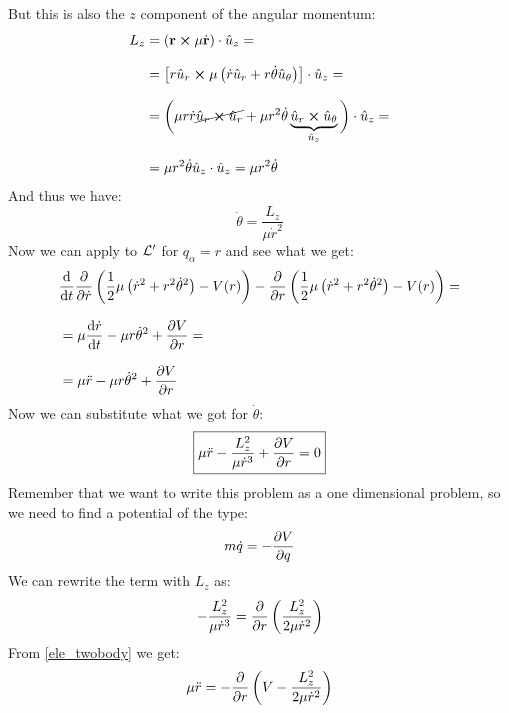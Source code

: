But this is also the $z$ component of the angular momentum:
\begin{equation}
  \begin{split}
    L_z &= \left(\vb{r}\cross \mu\dot{\vb{r}}\right) \cdot \hat{u}_z = \\[8pt]
    &= \left[r\hat{u}_r \cross \mu\left(\dot{r}\hat{u}_r + r\dot{\theta}\hat{u}_{\theta}\right)\right] \cdot \hat{u}_z = \\[8pt]
    &= \bigg(\mu r\dot{r} \cancel{\hat{u}_r \cross \hat{u}_r} + \mu r^2\dot{\theta}\underbrace{\hat{u}_r \cross \hat{u}_{\theta}}_{\hat{u}_z}\bigg) \cdot \hat{u}_z = \\[8pt]
    &= \mu r^2\dot{\theta} \hat{u}_z \cdot \hat{u}_z = \mu r^2\dot{\theta}
  \end{split}
\end{equation}
And thus we have:
\begin{equation}
  \dot{\theta} = \dfrac{L_z}{\mu \dot{r}^2}
\end{equation}
Now we can apply \eleref\;to $\mathcal{L}'$ for $q_{\alpha} = r$ and see what we get:
\begin{equation}
  \begin{split}
    &\dv{}{t}\pdv{}{\dot{r}}\brackets{\dfrac{1}{2}\mu\brackets{\dot{r}^2 + r^2\dot{\theta}^2} - V(r)} - \pdv{}{r}\brackets{\dfrac{1}{2}\mu\brackets{\dot{r}^2 + r^2\dot{\theta}^2} - V(r)} = \\[8pt]
    &= \mu\dv{\dot{r}}{t} - \mu r\dot{\theta}^2 + \pdv{V}{r}  = \\[8pt]
    &= \mu \ddot{r} - \mu r\dot{\theta}^2 + \pdv{V}{r}
  \end{split}
\end{equation}
Now we can substitute what we got for $\dot{\theta}$:
\begin{equation} \label{ele_twobody}
  \boxed{\mu \ddot{r} - \dfrac{L_z^2}{\mu \dot{r}^3} + \pdv{V}{r} = 0}
\end{equation}
Remember that we want to write this problem as a one dimensional problem, so we need to find a potential of the type:
\begin{equation}
  m\dot{q} = -\pdv{V}{q}
\end{equation}
We can rewrite the term with $L_z$ as:
\begin{equation}
  - \dfrac{L_z^2}{\mu \dot{r}^3} = \pdv{}{r}\brackets{\dfrac{L_z^2}{2\mu \dot{r}^2}}
\end{equation}
From \eqref{ele_twobody} we get:
\begin{equation}
  \mu \ddot{r} = -\pdv{}{r}\brackets{V - \dfrac{L_z^2}{2\mu \dot{r}^2}}
\end{equation}
